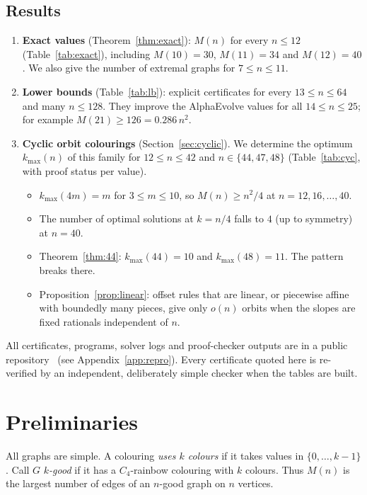 \documentclass[11pt]{amsart}
\theoremstyle{definition}
\newcommand{\M}{M}
\newcommand{\kmax}{k_{\max}}
\begin{document}
\subsection*{Results}
\begin{enumerate}
\item \textbf{Exact values} (Theorem~\ref{thm:exact}): $\M(n)$ for every $n\le12$
  (Table~\ref{tab:exact}), including $\M(10)=30$, $\M(11)=34$ and $\M(12)=40$.
  We also give the number of extremal graphs for $7\le n\le 11$.
\item \textbf{Lower bounds} (Table~\ref{tab:lb}): explicit certificates for every
  $13\le n\le 64$ and many $n\le128$. They improve the AlphaEvolve values for all
  $14\le n\le 25$; for example $\M(21)\ge126=0.286\,n^2$.
\item \textbf{Cyclic orbit colourings} (Section~\ref{sec:cyclic}). We determine the
  optimum $\kmax(n)$ of this family for $12\le n\le 42$ and $n\in\{44,47,48\}$
  (Table~\ref{tab:cyc}, with proof status per value).
  \begin{itemize}
  \item $\kmax(4m)=m$ for $3\le m\le 10$, so $\M(n)\ge n^2/4$ at $n=12,16,\dots,40$.
  \item The number of optimal solutions at $k=n/4$ falls to $4$ (up to symmetry) at $n=40$.
  \item Theorem~\ref{thm:44}: $\kmax(44)=10$ and $\kmax(48)=11$. The pattern breaks there.
  \item Proposition~\ref{prop:linear}: offset rules that are linear, or piecewise affine
    with boundedly many pieces, give only $o(n)$ orbits when the slopes are fixed rationals
    independent of $n$.
  \end{itemize}
\end{enumerate}

All certificates, programs, solver logs and proof-checker outputs are in a public
repository~\cite{Repo} (see Appendix~\ref{app:repro}). Every certificate quoted here is
re-verified by an independent, deliberately simple checker when the tables are built.

\section{Preliminaries}

All graphs are simple. A colouring \emph{uses $k$ colours} if it takes values in
$\{0,\dots,k-1\}$. Call $G$ \emph{$k$-good} if it has a $C_4$-rainbow colouring with $k$
colours. Thus $\M(n)$ is the largest number of edges of an $n$-good graph on $n$ vertices.
\end{document}
